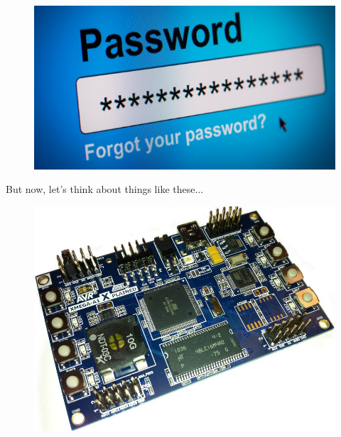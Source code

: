 \documentclass{beamer}
\begin{document}
\begin{frame}
\begin{figure}
  \centering
    \includegraphics[width=\linewidth,height=\textheight,keepaspectratio]{images/password1-618x336.jpg}
    \cite{Password}
\end{figure}
\end{frame}

\begin{frame}
    \begin{center}But now, let's think about things like these...\end{center}
\end{frame}

\begin{frame}
\begin{figure}
  \centering
    \includegraphics[scale=0.404]{images/embedded.jpg}
    \cite{Embedded}
\end{figure}
\end{frame}
\end{document}
